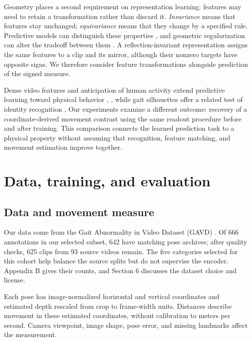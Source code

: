 \documentclass{article}
\begin{document}
Geometry places a second requirement on representation learning: features may need to retain a transformation rather than discard it. \emph{Invariance} means that features stay unchanged; \emph{equivariance} means that they change by a specified rule. Predictive models can distinguish these properties \citep{ref08}, and geometric regularization can alter the tradeoff between them \citep{ref09}. A reflection-invariant representation assigns the same features to a clip and its mirror, although their nonzero targets have opposite signs. We therefore consider feature transformations alongside prediction of the signed measure.

Dense video features and anticipation of human activity extend predictive learning toward physical behavior \citep{ref10}, \citep{ref11}, while gait silhouettes offer a related test of identity recognition \citep{ref12}. Our experiments examine a different outcome: recovery of a coordinate-derived movement contrast using the same readout procedure before and after training. This comparison connects the learned prediction task to a physical property without assuming that recognition, feature matching, and movement estimation improve together.

\section{Data, training, and evaluation}\label{data-training-and-evaluation}

\subsection{Data and movement measure}\label{data-and-movement-measure}

Our data come from the Gait Abnormality in Video Dataset (GAVD) \citep{ref13}. Of 666 annotations in our selected subset, 642 have matching pose archives; after quality checks, 625 clips from 93 source videos remain. The five categories selected for this cohort help balance the source splits but do not supervise the encoder. Appendix B gives their counts, and Section 6 discusses the dataset choice and license.

Each pose has image-normalized horizontal and vertical coordinates and estimated depth rescaled from crop to frame-width units. Distances describe movement in these estimated coordinates, without calibration to meters per second. Camera viewpoint, image shape, pose error, and missing landmarks affect the measurement.
\end{document}
